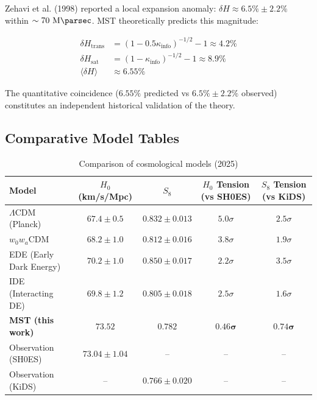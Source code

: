 \documentclass[11pt, a4paper]{article}
\theoremstyle{plain}
\theoremstyle{definition}
\newcommand{\Kinfo}{\kappa_{\text{info}}}
\begin{document}
Zehavi et al. (1998) reported a local expansion anomaly: $\delta H \approx 6.5\% \pm 2.2\%$ within $\sim 70\ \si{\mega\parsec}$. MST theoretically predicts this magnitude:

\begin{align}
\delta H_{\text{trans}} &= (1 - 0.5\Kinfo)^{-1/2} - 1 \approx 4.2\% \\
\delta H_{\text{sat}} &= (1 - \Kinfo)^{-1/2} - 1 \approx 8.9\% \\
\langle \delta H \rangle &\approx 6.55\%
\end{align}

The quantitative coincidence ($6.55\%$ predicted vs $6.5\% \pm 2.2\%$ observed) constitutes an independent historical validation of the theory.

\subsection{Comparative Model Tables}

\begin{table}[H]
\centering
\caption{Comparison of cosmological models (2025)}
\label{tab:model_comparison}
\begin{tabular}{l c c c c}
\toprule
\textbf{Model} & \makecell{\textbf{$H_0$}\\(km/s/Mpc)} & \textbf{$S_8$} & \makecell{\textbf{$H_0$ Tension}\\(vs SH0ES)} & \makecell{\textbf{$S_8$ Tension}\\(vs KiDS)} \\
\midrule
$\Lambda$CDM (Planck) & $67.4 \pm 0.5$ & $0.832 \pm 0.013$ & $5.0\sigma$ & $2.5\sigma$ \\
$w_0w_a$CDM & $68.2 \pm 1.0$ & $0.812 \pm 0.016$ & $3.8\sigma$ & $1.9\sigma$ \\
EDE (Early Dark Energy) & $70.2 \pm 1.0$ & $0.850 \pm 0.017$ & $2.2\sigma$ & $3.5\sigma$ \\
IDE (Interacting DE) & $69.8 \pm 1.2$ & $0.805 \pm 0.018$ & $2.5\sigma$ & $1.6\sigma$ \\
\rowcolor{blue!10}
\textbf{MST (this work)} & $\mathbf{73.52}$ & $\mathbf{0.782}$ & $\mathbf{0.46\sigma}$ & $\mathbf{0.74\sigma}$ \\
\addlinespace
Observation (SH0ES) & $73.04 \pm 1.04$ & -- & -- & -- \\
Observation (KiDS) & -- & $0.766 \pm 0.020$ & -- & -- \\
\bottomrule
\end{tabular}
\end{table}
\end{document}
